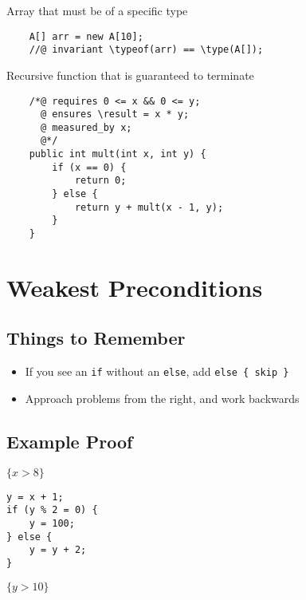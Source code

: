 \documentclass[landscape]{cheat}
\begin{document}
\begin{multicols*}{3}
Array that must be of a specific type
\begin{lstlisting}
    A[] arr = new A[10];
    //@ invariant \typeof(arr) == \type(A[]);
\end{lstlisting}

Recursive function that is guaranteed to terminate
\begin{lstlisting}
    /*@ requires 0 <= x && 0 <= y;
      @ ensures \result = x * y;
      @ measured_by x;
      @*/
    public int mult(int x, int y) {
        if (x == 0) {
            return 0;
        } else {
            return y + mult(x - 1, y);
        }
    }
\end{lstlisting}

\section{Weakest Preconditions}

\subsection{Things to Remember}
\begin{itemize}
    \item If you see an \texttt{if} without an \texttt{else}, add \texttt{else \{ skip \}}
    \item Approach problems from the right, and work backwards
\end{itemize}

\subsection{Example Proof}
$\{ x > 8 \}$
\begin{lstlisting}
y = x + 1;
if (y % 2 = 0) {
    y = 100;
} else {
    y = y + 2;
}
\end{lstlisting}
$\{y > 10\}$


\end{multicols*}
\end{document}
